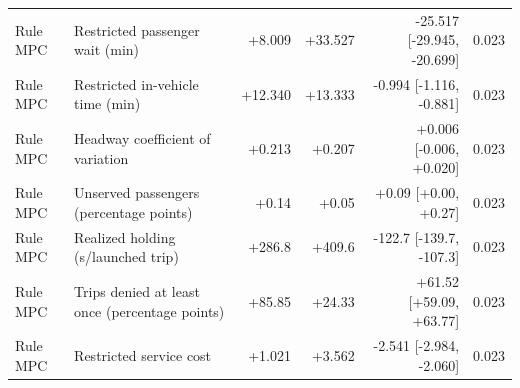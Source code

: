 \begin{tabular}{llrrrr}
Rule MPC & Restricted passenger wait (min) & +8.009 & +33.527 & -25.517 [-29.945, -20.699] & 0.023 \\
Rule MPC & Restricted in-vehicle time (min) & +12.340 & +13.333 & -0.994 [-1.116, -0.881] & 0.023 \\
Rule MPC & Headway coefficient of variation & +0.213 & +0.207 & +0.006 [-0.006, +0.020] & 0.023 \\
Rule MPC & Unserved passengers (percentage points) & +0.14 & +0.05 & +0.09 [+0.00, +0.27] & 0.023 \\
Rule MPC & Realized holding (s/launched trip) & +286.8 & +409.6 & -122.7 [-139.7, -107.3] & 0.023 \\
Rule MPC & Trips denied at least once (percentage points) & +85.85 & +24.33 & +61.52 [+59.09, +63.77] & 0.023 \\
Rule MPC & Restricted service cost & +1.021 & +3.562 & -2.541 [-2.984, -2.060] & 0.023 \\
\bottomrule
\end{tabular}
